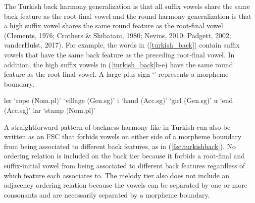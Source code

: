 \documentclass[,doc,floatsintext]{apa6}
\theoremstyle{definition}
\theoremstyle{definition}
\theoremstyle{definition}
\theoremstyle{remark}
\begin{document}
The Turkish back harmony generalization is that all suffix vowels share
the same back feature as the root-final vowel and the round harmony
generalization is that a high suffix vowel shares the same round feature
as the root-final vowel (Clements, 1976; Crothers \& Shibatani, 1980;
Nevins, 2010; Padgett, 2002; vanderHulst, 2017). For example, the words
in (\ref{turkish_back}) contain suffix vowels that have the same back
feature as the preceding root-final vowel. In addition, the high suffix
vowels in (\ref{turkish_back}b-e) have the same round feature as the
root-final vowel. A large plus sign `\textipa{\LARGE+}' represents a
morpheme boundary.

\begin{exe}
\label{turkish_back} 
\begin{xlist}
  \ex {}ler `rope (Nom.pl)'
  \ex {} `village (Gen.sg)'
  \ex {}i   `hand (Acc.sg)'
  \ex {} `girl (Gen.sg)'
  \ex {}u  `end (Acc.sg)'
  \ex {}lar `stamp (Nom.pl)'
\end{xlist}
\end{exe}

A straightforward pattern of backness harmony like in Turkish can also
be written as an FSC that forbids vowels on either side of a morpheme
boundary from being associated to different back features, as in
(\ref{fsc.turkishback}). No ordering relation is included on the back
tier because it forbids a root-final and suffix-initial vowel from being
associated to different back features regardless of which feature each
associates to. The melody tier also does not include an adjacency
ordering relation because the vowels can be separated by one or more
consonants and are necessarily separated by a morpheme boundary.

\begin{exe}
\ex \label{fsc.turkishback}
\end{exe}
\end{document}
